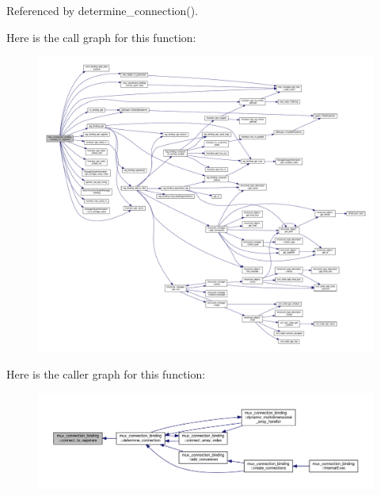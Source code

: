Referenced by determine\+\_\+connection().

Here is the call graph for this function\+:
\nopagebreak
\begin{figure}[H]
\begin{center}
\leavevmode
\includegraphics[width=350pt]{d7/d1e/classmux__connection__binding_a19eaa5ec4596679c457c35b7aa4061ed_cgraph}
\end{center}
\end{figure}
Here is the caller graph for this function\+:
\nopagebreak
\begin{figure}[H]
\begin{center}
\leavevmode
\includegraphics[width=350pt]{d7/d1e/classmux__connection__binding_a19eaa5ec4596679c457c35b7aa4061ed_icgraph}
\end{center}
\end{figure}
\mbox{\label{classmux__connection__binding_a7c22a4143586f31111cd64e34f1c9a59}} 
